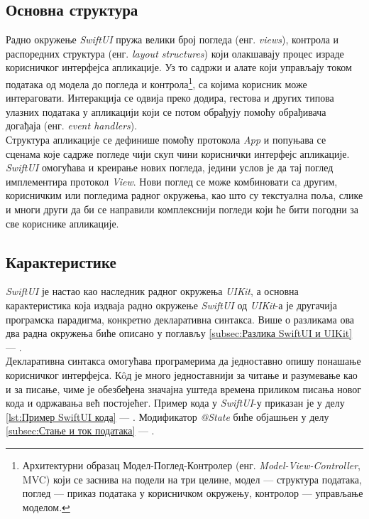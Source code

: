 \documentclass[12pt,oneside]{memoir}
\begin{document}
\subsection{Основна структура}

\indent Радно окружење \textit{SwiftUI} пружа велики број погледа (енг. \textit{views}), контрола и распоредних структура (енг. \textit{layout structures}) који олакшавају процес израде корисничког интерфејса апликације. Уз то садржи и алате који управљају током података од модела до погледа и контрола\footnote{Архитектурни образац Модел-Поглед-Контролер (енг. \textit{Model-View-Controller}, MVC) који се заснива на подели на три целине, модел --- структура података, поглед --- приказ података у корисничком окружењу, контролор --- управљање моделом.}, са којима корисник може интераговати. Интеракција се одвија преко додира, гестова и других типова улазних података у апликацији који се потом обрађују помоћу обрађивача догађаја (енг. \textit{event handlers}).
\\
\indent Структура апликације се дефинише помоћу протокола \textit{App} и попуњава се сценама које садрже погледе чији скуп чини кориснички интерфејс апликације. \textit{SwiftUI} омогућава и креирање нових погледа, једини услов је да тај поглед имплементира протокол \textit{View}. Нови поглед се може комбиновати са другим, корисничким или погледима радног окружења, као што су текстуална поља, слике и многи други да би се направили комплекснији погледи који ће бити погодни за све кориснике апликације.

\subsection{Карактеристике}

\indent \textit{SwiftUI} је настао као наследник радног окружења \textit{UIKit}, а основна карактеристика која издваја радно окружење \textit{SwiftUI} од \textit{UIKit}-а је другачија програмска парадигма, конкретно декларативна синтакса. Више о разликама ова два радна окружења биће описано у поглављу \ref{subsec:Разлика SwiftUI и UIKit} --- . 
\\
\indent Декларативна синтакса омогућава програмерима да једноставно опишу понашање корисничког интерфејса. К\^{o}д је много једноставнији за читање и разумевање као и за писање, чиме је обезбеђена значајна уштеда времена приликом писања новог кода и одржавања већ постојећег. Пример кода у \textit{SwiftUI}-у приказан је у делу \ref{lst:Пример SwiftUI кода} --- . Модификатор \textit{@State} биће објашњен у делу \ref{subsec:Стање и ток података} --- .
\end{document}
